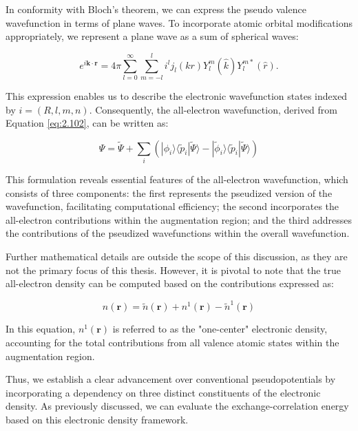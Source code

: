 In conformity with Bloch's theorem, we can express the pseudo valence wavefunction in terms of plane waves. To incorporate atomic orbital modifications appropriately, we represent a plane wave as a sum of spherical waves:  

\begin{equation}  
	e^{i \mathbf{k} \cdot \mathbf{r}} = 4 \pi \sum_{l=0}^{\infty} \sum_{m=-l}^{l} i^{l} j_{l}(k r) Y_{l}^{m} (\hat{k}) Y_{l}^{m*} (\hat{r}).  
\end{equation}  

This expression enables us to describe the electronic wavefunction states indexed by \(i=(R,l,m,n)\). Consequently, the all-electron wavefunction, derived from Equation \ref{eq:2.102}, can be written as:  

\begin{equation}  
	\Psi = \tilde{\Psi} + \sum_{i} \left( | \phi_i \rangle \langle \tilde{p}_i | \tilde{\Psi} \rangle - | \tilde{\phi}_i \rangle \langle \tilde{p}_i | \tilde{\Psi} \rangle \right)  
	\label{eq:2.104}  
\end{equation}  

This formulation reveals essential features of the all-electron wavefunction, which consists of three components: the first represents the pseudized version of the wavefunction, facilitating computational efficiency; the second incorporates the all-electron contributions within the augmentation region; and the third addresses the contributions of the pseudized wavefunctions within the overall wavefunction.  

Further mathematical details are outside the scope of this discussion, as they are not the primary focus of this thesis. However, it is pivotal to note that the true all-electron density can be computed based on the contributions expressed as:  

\begin{equation}  
	n(\mathbf{r}) = \tilde{n}(\mathbf{r}) + n^{1}(\mathbf{r}) - \tilde{n}^{1}(\mathbf{r})  
\end{equation}  

In this equation, \(n^{1}(\mathbf{r})\) is referred to as the "one-center" electronic density, accounting for the total contributions from all valence atomic states within the augmentation region.  

Thus, we establish a clear advancement over conventional pseudopotentials by incorporating a dependency on three distinct constituents of the electronic density. As previously discussed, we can evaluate the exchange-correlation energy based on this electronic density framework.  

